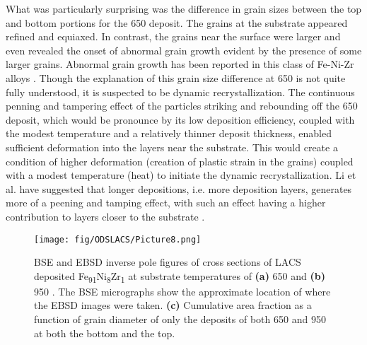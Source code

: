 	What was particularly surprising was the difference in grain sizes between the top and bottom portions for the 650 \celsius{} deposit. The grains at the substrate appeared refined and equiaxed. In contrast, the grains near the surface were larger and even revealed the onset of abnormal grain growth evident by the presence of some larger grains. Abnormal grain growth has been reported in this class of Fe-Ni-Zr alloys \cite{RN740}. Though the explanation of this grain size difference at 650 \celsius{} is not quite fully understood, it is suspected to be dynamic recrystallization. The continuous penning and tampering effect of the particles striking and rebounding off the 650 \celsius{} deposit, which would be pronounce by its low deposition efficiency, coupled with the modest temperature and a relatively thinner deposit thickness, enabled sufficient deformation into the layers near the substrate. This would create a condition of higher deformation (creation of plastic strain in the grains) coupled with a modest temperature (heat) to initiate the dynamic recrystallization. Li et al. have suggested that longer depositions, i.e. more deposition layers, generates more of a peening and tamping effect, with such an effect having a higher contribution to layers closer to the substrate \cite{RN171,RN679}. 




			\begin{figure}
				\centering
				\texttt{[image: fig/ODSLACS/Picture8.png]}
				\caption[BSE and EBSD inverse pole figures of cross sections of LACS deposited Fe\textsubscript{91}Ni\textsubscript{8}Zr\textsubscript{1 }at substrate temperatures of \textbf{(a)} 650 \celsius{} and \textbf{(b)} 950 \celsius{}.]{BSE and EBSD inverse pole figures of cross sections of LACS deposited Fe\textsubscript{91}Ni\textsubscript{8}Zr\textsubscript{1 }at substrate temperatures of \textbf{(a)} 650 \celsius{} and \textbf{(b)} 950 \celsius{}. The BSE micrographs show the approximate location of where the EBSD images were taken. \textbf{(c) }Cumulative area fraction as a function of grain diameter of only the deposits of both 650 \celsius{} and 950 \celsius{} at both the bottom and the top.}
				\label{fig:ODSLACS8}
			\end{figure}



